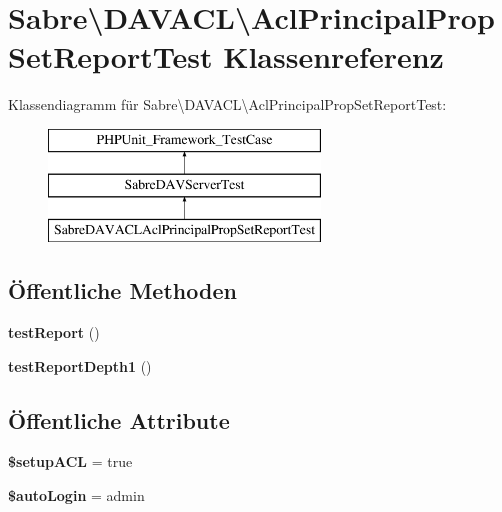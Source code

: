 \hypertarget{class_sabre_1_1_d_a_v_a_c_l_1_1_acl_principal_prop_set_report_test}{}\section{Sabre\textbackslash{}D\+A\+V\+A\+CL\textbackslash{}Acl\+Principal\+Prop\+Set\+Report\+Test Klassenreferenz}
\label{class_sabre_1_1_d_a_v_a_c_l_1_1_acl_principal_prop_set_report_test}
Klassendiagramm für Sabre\textbackslash{}D\+A\+V\+A\+CL\textbackslash{}Acl\+Principal\+Prop\+Set\+Report\+Test\+:\begin{figure}[H]
\begin{center}
\leavevmode
\includegraphics[height=3.000000cm]{class_sabre_1_1_d_a_v_a_c_l_1_1_acl_principal_prop_set_report_test}
\end{center}
\end{figure}
\subsection*{Öffentliche Methoden}
\begin{DoxyCompactItemize}
\item 
\mbox{\label{class_sabre_1_1_d_a_v_a_c_l_1_1_acl_principal_prop_set_report_test_aa060af4c6599cacce92586f002ee045f}} 
{\bfseries test\+Report} ()
\item 
\mbox{\label{class_sabre_1_1_d_a_v_a_c_l_1_1_acl_principal_prop_set_report_test_a72e552650ba91f991eb21359e1da207d}} 
{\bfseries test\+Report\+Depth1} ()
\end{DoxyCompactItemize}
\subsection*{Öffentliche Attribute}
\begin{DoxyCompactItemize}
\item 
\mbox{\label{class_sabre_1_1_d_a_v_a_c_l_1_1_acl_principal_prop_set_report_test_a0443a340ffdd24491afbf0fab6869a93}} 
{\bfseries \$setup\+A\+CL} = true
\item 
\mbox{\label{class_sabre_1_1_d_a_v_a_c_l_1_1_acl_principal_prop_set_report_test_a71e8cbb138257a25df9966dea7d32d34}} 
{\bfseries \$auto\+Login} = \textquotesingle{}admin\textquotesingle{}
\end{DoxyCompactItemize}
